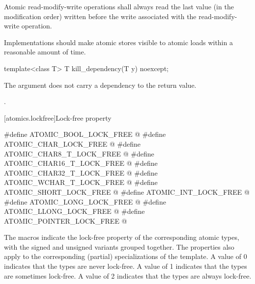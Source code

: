 \pnum
Atomic read-modify-write operations shall always read the last value
(in the modification order) written before the write associated with
the read-modify-write operation.

\pnum
Implementations should make atomic stores visible to atomic loads within a reasonable
amount of time.

%
\begin{itemdecl}
template<class T>
  T kill_dependency(T y) noexcept;
\end{itemdecl}

\begin{itemdescr}
\pnum
\effects
The argument does not carry a dependency to the return
value.

\pnum
\returns
{}.
\end{itemdescr}


[atomics.lockfree]{Lock-free property}

%
%
%
%
%
%
%
%
%
%
%
\begin{codeblock}
#define ATOMIC_BOOL_LOCK_FREE @\unspec@
#define ATOMIC_CHAR_LOCK_FREE @\unspec@
#define ATOMIC_CHAR8_T_LOCK_FREE @\unspec@
#define ATOMIC_CHAR16_T_LOCK_FREE @\unspec@
#define ATOMIC_CHAR32_T_LOCK_FREE @\unspec@
#define ATOMIC_WCHAR_T_LOCK_FREE @\unspec@
#define ATOMIC_SHORT_LOCK_FREE @\unspec@
#define ATOMIC_INT_LOCK_FREE @\unspec@
#define ATOMIC_LONG_LOCK_FREE @\unspec@
#define ATOMIC_LLONG_LOCK_FREE @\unspec@
#define ATOMIC_POINTER_LOCK_FREE @\unspec@
\end{codeblock}

\pnum
The  macros indicate the lock-free property of the
corresponding atomic types, with the signed and unsigned variants grouped
together. The properties also apply to the corresponding (partial) specializations of the
 template. A value of 0 indicates that the types are never
lock-free. A value of 1 indicates that the types are sometimes lock-free. A
value of 2 indicates that the types are always lock-free.

